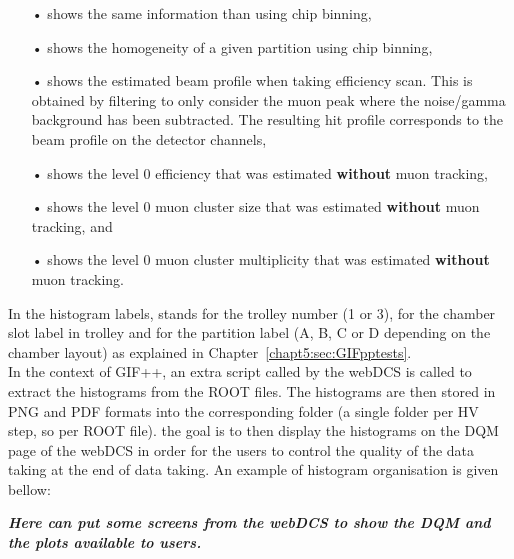 \begin{itemize}
		\item[•]  shows the same information than  using chip binning,
		\item[•]  shows the homogeneity of a given partition using chip binning,
		\item[•]  shows the estimated beam profile when taking efficiency scan. This is obtained by filtering  to only consider the muon peak where the noise/gamma background has been subtracted. The resulting hit profile corresponds to the beam profile on the detector channels,
		\item[•]  shows the level 0 efficiency that was estimated \textbf{without} muon tracking,
		\item[•]  shows the level 0 muon cluster size that was estimated \textbf{without} muon tracking, and
		\item[•]  shows the level 0 muon cluster multiplicity that was estimated \textbf{without} muon tracking.
	\end{itemize}

	In the histogram labels,  stands for the trolley number (1 or 3),  for the chamber slot label in trolley   and  for the partition label (A, B, C or D depending on the chamber layout) as explained in Chapter~\ref{chapt5:sec:GIFpptests}.\\
	
	In the context of GIF++, an extra script called by the webDCS is called to extract the histograms from the ROOT files. The histograms are then stored in PNG and PDF formats into the corresponding folder (a single folder per HV step, so per ROOT file). the goal is to then display the histograms on the \acf{DQM} page of the webDCS in order for the users to control the quality of the data taking at the end of data taking. An example of histogram organisation is given bellow:\\
	
	\newpage
	
	\vspace{5mm}
	\textbf{\textit{Here can put some screens from the webDCS to show the DQM and the plots available to users.\\}}
	

